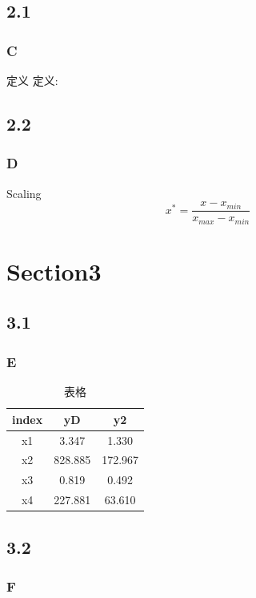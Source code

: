 \documentclass[11pt]{beamer}                                                                                                                 \usetheme{Madrid}
\begin{document}
\subsection{2.1}
\begin{frame}[fragile]
	\frametitle{C}
	\begin{block}{定义}
		定义:
	\end{block}
\end{frame}

\subsection{2.2}
\begin{frame}[fragile]
	\frametitle{D}
		\begin{block}{Scaling}
		$$ x^* = \frac{x - x_{min}}{x_{max} - x_{min}} $$
	\end{block}
\end{frame}

\section{Section3}
\subsection{3.1}
\begin{frame}[fragile]
	\frametitle{E}
	\begin{table}[]
		\begin{tabular}{|c|c|c|}
			\hline
			index & yD & y2 \\ \hline
			x1          &      3.347&    1.330\\ \hline
			x2          &      828.885&    172.967\\ \hline
			x3 &      0.819&    0.492\\ \hline
			x4 &      227.881&    63.610\\ \hline
		\end{tabular}
		\caption{表格}
	\end{table}
\end{frame}

\subsection{3.2}
\begin{frame}[fragile]
	\frametitle{F}
\end{frame}
\end{document}

